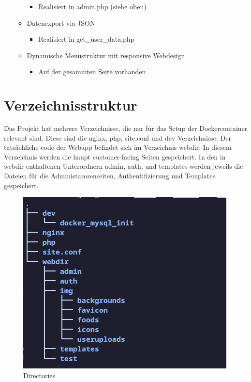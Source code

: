 \documentclass{article}
\begin{document}
\begin{itemize}
\begin{itemize}
\begin{itemize}
                \item Realisiert in admin.php (siehe oben)
            \end{itemize}
        \item Datenexport via JSON
            \begin{itemize}
                \item Realisiert in get\_user\_data.php
            \end{itemize}
        \item Dynamische Menüstruktur mit responsive Webdesign
            \begin{itemize}
                \item Auf der gesammten Seite vorhanden
            \end{itemize}
    \end{itemize}
\end{itemize}
\label{tab:my_label}

\pagebreak
\section{Verzeichnisstruktur}
Das Projekt hat mehrere Verzeichnisse, die nur für das Setup der Dockercontainer relevant sind. Diese sind die nginx, php, site.conf und dev Verzeichnisse. Der tatsächliche code der Webapp befindet sich im Verzeichnis webdir. In diesem Verzeichnis werden die haupt customer-facing Seiten gespeichert. In den in webdir enthaltenen Unterordnern admin, auth, und templates werden jeweils die Dateien für die Administarorenseiten, Authentifizierung und Templates gespeichert.

\begin{figure}[!hbt]
    \centering
    \includegraphics[scale=0.75, width=\textwidth]{Pictures/Dirs1.png}
    \caption{Directories}
    \label{fig:sfig1}
\end{figure}
\end{document}
